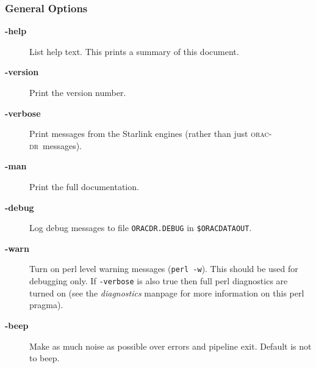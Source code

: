 \documentclass[twoside,11pt]{article}
\renewcommand{\_}{\texttt{\symbol{95}}}
\newcommand{\oracdr}{\textsc{orac-dr}}
\begin{document}
\subsubsection*{General Options\label{oracdr_General_Options}}\begin{description}
\item[\textbf{-help}] \mbox{}

List help text. This prints a summary of this document.

\item[\textbf{-version}] \mbox{}

Print the version number.

\item[\textbf{-verbose}] \mbox{}

Print messages from the Starlink engines (rather than just \oracdr\
messages).

\item[\textbf{-man}] \mbox{}

Print the full documentation.

\item[\textbf{-debug}] \mbox{}

Log debug messages to file \texttt{ORACDR.DEBUG} in \texttt{\$ORAC\_DATA\_OUT}.

\item[\textbf{-warn}] \mbox{}

Turn on perl level warning messages (\texttt{perl -w}). This should be
used for debugging only. If \texttt{-verbose} is also true then full 
perl diagnostics are turned on (see the \emph{diagnostics} manpage for more information
on this perl pragma).

\item[\textbf{-beep}] \mbox{}

Make as much noise as possible over errors and pipeline exit.
Default is not to beep.

\end{description}
\end{document}
